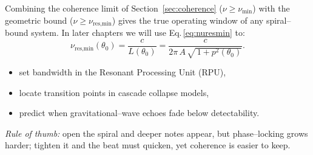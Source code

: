 Combining the coherence limit of Section~\ref{sec:coherence}
($\nu\ge\nu_{\min}$) with the geometric bound
($\nu\ge\nu_{\text{res,min}}$) gives the true operating window of any
spiral–bound system.  In later chapters we will use
Eq.\,\eqref{eq:nuresmin} to:
\begin{equation}
\label{eq:nuresmin}
  \nu_{\text{res,min}}(\theta_0)=
  \frac{c}{L(\theta_0)}=
  \frac{c}{2\pi\,A\,\sqrt{\,1+p^2(\theta_0)}}.
\end{equation}

\begin{itemize}
\item set bandwidth in the Resonant Processing Unit (RPU),
\item locate transition points in cascade collapse models,
\item predict when gravitational--wave echoes fade below detectability.
\end{itemize}

\bigskip
\noindent
\emph{Rule of thumb:} open the spiral and deeper notes appear, but
phase--locking grows harder; tighten it and the beat must quicken, yet
coherence is easier to keep.



